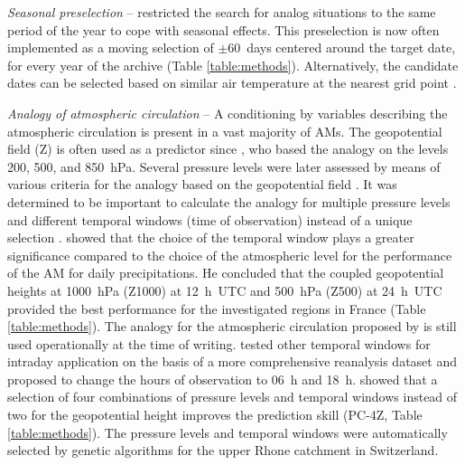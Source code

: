 \documentclass[gmd]{copernicus}
\begin{document}
\textit{Seasonal preselection} -- \citet{Lorenz1969} restricted the search for analog situations to the same period of the year to cope with seasonal effects. This preselection is now often implemented as a moving selection of $\pm$60~days centered around the target date, for every year of the archive (Table \ref{table:methods}). Alternatively, the candidate dates can be selected based on similar air temperature at the nearest grid point \citep[Table \ref{table:methods}][]{BenDaoud2016}.

\textit{Analogy of atmospheric circulation} -- A conditioning by variables describing the atmospheric circulation is present in a vast majority of AMs. The geopotential field (Z) is often used as a predictor since \citet{Lorenz1969}, who based the analogy on the levels 200, 500, and 850~hPa. Several pressure levels were later assessed by means of various criteria for the analogy based on the geopotential field \citep{Duband1970, Duband1974, Duband1981, Guilbaud1997}. It was determined to be important to calculate the analogy for multiple pressure levels and different temporal windows (time of observation) instead of a unique selection \citep{Guilbaud1998, Obled2002}. \citet{Bontron2004} showed that the choice of the temporal window plays a greater significance compared to the choice of the atmospheric level for the performance of the AM for daily precipitations. He concluded that the coupled geopotential heights at 1000~hPa (Z1000) at 12~h~UTC and 500~hPa (Z500) at 24~h~UTC provided the best performance \citep[for a subset of the NCEP/NCAR Reanalysis I;][]{Kalnay1996, Kistler2001} for the investigated regions in France (Table \ref{table:methods}). The analogy for the atmospheric circulation proposed by \citet{Bontron2004} is still used operationally at the time of writing. \citet{Marty2010} tested other temporal windows for intraday application on the basis of a more comprehensive reanalysis dataset and proposed to change the hours of observation to 06~h and 18~h. \citet{Horton2018a} showed that a selection of four combinations of pressure levels and temporal windows instead of two for the geopotential height improves the prediction skill (PC-4Z, Table \ref{table:methods}). The pressure levels and temporal windows were automatically selected by genetic algorithms for the upper Rhone catchment in Switzerland.
\end{document}
